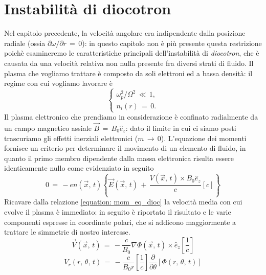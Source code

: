 \chapter{Instabilità di diocotron}

Nel capitolo precedente, la velocità angolare era indipendente dalla posizione radiale (ossia $\partial \omega/\partial r\,=\,0$): 
in questo capitolo non è più presente questa restrizione poichè esamineremo le caratteristiche principali dell'instabilità di 
\textit{diocotron}, che è causata da una velocità relativa non nulla presente fra diversi strati di fluido. Il plasma che 
vogliamo trattare è composto da soli elettroni ed a bassa densità: il regime con cui vogliamo lavorare è
\begin{equation}
    \begin{cases}
        \omega_p^2/\Omega^2\, \ll\,1,    \\
        n_i\left(r\right)\,=\,0.
    \end{cases}
\end{equation}
Il plasma elettronico che prendiamo in considerazione è confinato radialmente da un campo magnetico assiale $\vec{B}\,=\,B_0\hat{e}_z$: 
dato il limite in cui ci siamo posti trascuriamo gli effetti inerziali elettronici ($m\,\rightarrow\,0$). L'equazione dei momenti 
fornisce un criterio per determinare il movimento di un elemento di fluido, in quanto il primo membro dipendente dalla massa elettronica 
risulta essere identicamente nullo come evidenziato in seguito
\begin{equation}
    0\,=\,-en\left(\vec{x},\,t\right)\left\{\vec{E}\left(\vec{x},\,t\right)\,+\,\frac{V\left(\vec{x},\,t\right) \times B_0 \hat{e}_z}{c}\left[c\right]\right\}
    \label{equation: mom_eq_dioc}
\end{equation}
Ricavare dalla relazione \eqref{equation: mom_eq_dioc} la velocità media con cui evolve il plasma è immediato: in seguito è riportato il 
risultato e le varie componenti espresse in coordinate polari, che si addicono maggiormente a trattare le simmetrie di nostro interesse. 
\begin{equation}
    \vec{V}\left(\vec{x},\,t\right)\,=\,-\frac{c}{B_0}\nabla \Phi \left(\vec{x},\,t\right) \times \hat{e}_z\left[\frac{1}{c}\right]
    \label{equation: velocità_noinerzia}
\end{equation}
\begin{equation}
    V_r\left(r,\,\theta,\,t\right)\,=\,-\frac{c}{B_0 r}\left[\frac{1}{c}\right]\frac{\partial}{\partial \theta} \left[\Phi\left(r,\,\theta,\,t\right)\right]
\end{equation}
